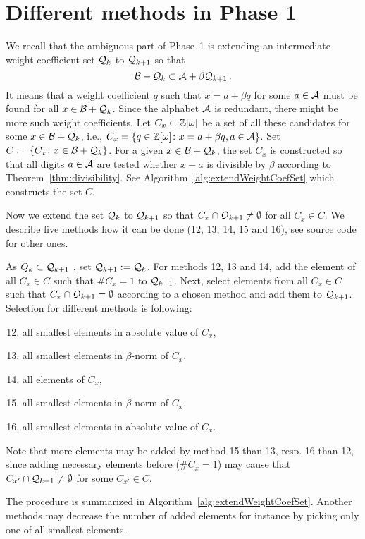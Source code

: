 \section{Different methods in Phase 1}
\label{sec:methodsOne}


We recall that the ambiguous part of Phase~1 is extending an intermediate weight coefficient set $\mathcal{Q}_k$ to $\mathcal{Q}_{k+1}$ so that 
$$
\mathcal{B}+\mathcal{Q}_k \subset \mathcal{A}+\beta \mathcal{Q}_{k+1}\,.
$$
It means that a weight coefficient $q$ such that $x=a+\beta q$ for some $a\in\mathcal{A}$ must be found for all $x\in \mathcal{B}+\mathcal{Q}_k$. Since the alphabet $\mathcal{A}$ is redundant, there might be more such weight coefficients. Let $C_x\subset \mathbb{Z}[\omega]$ be a set of all these candidates for some $x\in \mathcal{B}+\mathcal{Q}_k$, i.e., $C_x=\{q\in\mathbb{Z}[\omega]\colon x=a+\beta q, a\in\mathcal{A}\}$. Set $C:=\{C_x\colon x\in \mathcal{B}+\mathcal{Q}_k\}$. For a given $x\in \mathcal{B}+\mathcal{Q}_k$, the set $C_x$ is constructed so that all digits $a\in\mathcal{A}$ are tested whether $x-a$ is divisible by $\beta$ according to Theorem~\ref{thm:divisibility}. See Algorithm~\ref{alg:extendWeightCoefSet} which constructs the set $C$.

Now we extend the set $\mathcal{Q}_k$ to $\mathcal{Q}_{k+1}$ so that $C_x \cap \mathcal{Q}_{k+1} \neq \emptyset$ for all $C_x \in C$. We describe five methods how it can be done (12, 13, 14, 15 and 16), see source code for other ones. 

As $Q_k\subset \mathcal{Q}_{k+1}$ , set $\mathcal{Q}_{k+1}:=\mathcal{Q}_k$. For methods 12, 13 and 14, add  the element of all $C_x\in C$ such that $\#C_x=1$ to $\mathcal{Q}_{k+1}$. Next, select elements from all $C_x\in C$ such that $C_x \cap \mathcal{Q}_{k+1} = \emptyset$ according to a chosen method and add them to $\mathcal{Q}_{k+1}$. Selection for different methods is following:
\begin{enumerate}[ method 1 --]
	\setcounter{enumi}{11}
	\item all smallest elements in absolute value of $C_x$,
	\item all smallest elements in $\beta$-norm of $C_x$,
	\item all elements of $C_x$,
	\item all smallest elements in $\beta$-norm of $C_x$,
	\item all smallest elements in absolute value of $C_x$.
\end{enumerate}
Note that more elements may be added by method 15 than 13, resp. 16 than 12, since adding necessary elements before ($\#C_x=1$)  may cause that $C_{x'}\cap \mathcal{Q}_{k+1} \neq \emptyset$ for some $C_{x'}\in C$. 

The procedure is summarized in Algorithm~\ref{alg:extendWeightCoefSet}. 
Another methods may decrease the number of added elements for instance by picking only one of all smallest elements.
	


